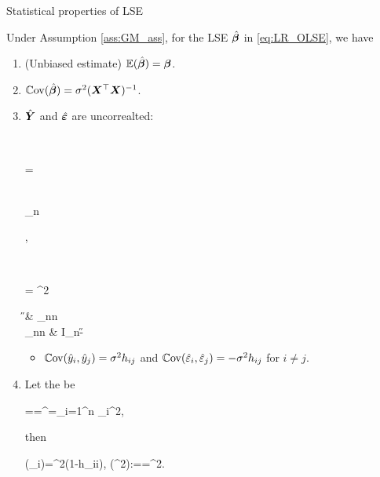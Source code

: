 \documentclass[10pt,a4paper]{book}
\begin{document}
\begin{thmbox}{Statistical properties of LSE}
	\begin{proposition}\label{prop:LR_LSE}
		Under Assumption \ref{ass:GM_ass}, for the LSE $\hat{{\boldsymbol\beta}}$ in \eqref{eq:LR_OLSE}, we have 
		\begin{enumerate}
			\item (Unbiased estimate) $\mathbb E(\hat{{\boldsymbol\beta}})={\boldsymbol\beta}$. 
			\item $\mathbb{C}\mathrm{ov}(\hat{{\boldsymbol\beta}})=\sigma^2({\boldsymbol X}^\top{\boldsymbol X})^{-1}$.
			\item $\hat{{\boldsymbol Y}}$ and $\hat{{\boldsymbol\varepsilon}}$ are uncorrealted:   
			\begin{sequation*}
				\bbE \begin{pmatrix}
					\hat{\Y} \\ \hat{\bave}
				\end{pmatrix} = \begin{pmatrix}
					\X\bab \\ \0_n
				\end{pmatrix}, \qquad \Cov\begin{pmatrix}
					\hat{\Y} \\ \hat{\bave}
				\end{pmatrix} = \sigma^2 \begin{pmatrix}
					\H & \0_{n\times n} \\ \0_{n\times n} & I_n-\H
				\end{pmatrix} 
			\end{sequation*}
			\begin{itemize}
				\item $\mathbb{C}\mathrm{ov}(\hat{y}_i,\hat{y}_j)=\sigma^2 h_{ij}$ and $\mathbb{C}\mathrm{ov}(\hat{\varepsilon}_i,\hat{\varepsilon}_j)=-\sigma^2 h_{ij}$ for $i\neq j$.   
			\end{itemize}
			\item Let the  be
			\begin{sequation}\label{eq:LR_LSE_SSE}
				\SSE=\RSS=\hat{\bave}^\TT\hat{\bave}=\sum_{i=1}^n \hat{\varepsilon}_i^2,
			\end{sequation}
			then
			\begin{sequation}\label{eq:LR_LSE_varest}
				\bbE(\hat{\varepsilon}_i)=\sigma^2(1-h_{ii}), \quad
				\bbE(\hat{\sigma}^2):=\bbE {}=\sigma^2. 
			\end{sequation}  
		\end{enumerate}
	\end{proposition}
\end{thmbox}
\end{document}

